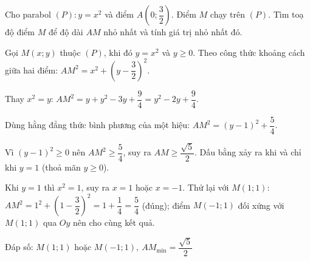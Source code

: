 \begin{problem}[9DS-HSB2-049]
Cho parabol $(P)\colon y = x^2$ và điểm $A\left(0; \dfrac{3}{2}\right)$. Điểm $M$ chạy trên $(P)$. Tìm toạ độ điểm $M$ để độ dài $AM$ nhỏ nhất và tính giá trị nhỏ nhất đó.

\begin{solution}
Gọi $M(x; y)$ thuộc $(P)$, khi đó $y = x^2$ và $y \geq 0$. Theo công thức khoảng cách giữa hai điểm: $AM^2 = x^2 + \left(y - \dfrac{3}{2}\right)^2$.

Thay $x^2 = y$: $AM^2 = y + y^2 - 3y + \dfrac{9}{4} = y^2 - 2y + \dfrac{9}{4}$.

Dùng hằng đẳng thức bình phương của một hiệu: $AM^2 = (y - 1)^2 + \dfrac{5}{4}$.

Vì $(y - 1)^2 \geq 0$ nên $AM^2 \geq \dfrac{5}{4}$, suy ra $AM \geq \dfrac{\sqrt{5}}{2}$. Dấu bằng xảy ra khi và chỉ khi $y = 1$ (thoả mãn $y \geq 0$).

Khi $y = 1$ thì $x^2 = 1$, suy ra $x = 1$ hoặc $x = -1$. Thử lại với $M(1; 1)$: $AM^2 = 1^2 + \left(1 - \dfrac{3}{2}\right)^2 = 1 + \dfrac{1}{4} = \dfrac{5}{4}$ (đúng); điểm $M(-1; 1)$ đối xứng với $M(1; 1)$ qua $Oy$ nên cho cùng kết quả.

Đáp số: $\boxed{M(1; 1) \text{ hoặc } M(-1; 1),\ AM_{\min} = \dfrac{\sqrt{5}}{2}}$
\end{solution}
\end{problem}


